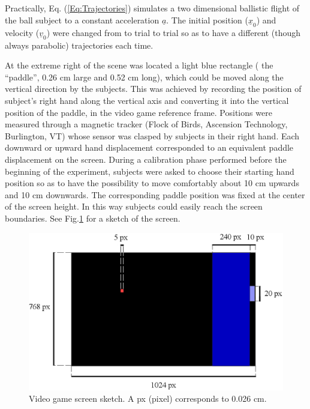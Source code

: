 Practically, Eq. (\ref{Eq:Trajectories}) simulates a two dimensional ballistic flight of the ball
subject to a constant acceleration $\underline{a}$. The initial position ($\underline{x}_0$) and velocity ($\underline{v}_0$) were changed from to trial to trial so as to have a different (though always parabolic) trajectories each time.

At the extreme right of the scene was located a light blue rectangle ( the ``paddle'', 0.26 cm large and 0.52 cm long), which could be moved along the vertical direction by the subjects. This was achieved by recording the position of subject's right hand along the vertical axis and converting it into the vertical position of the paddle, in the video game reference frame. 
Positions were measured through a magnetic tracker (Flock of Birds, Ascension Technology, Burlington, VT) whose sensor was clasped by subjects in their right hand. Each downward or upward hand displacement corresponded to an equivalent paddle displacement on the screen. During a calibration phase performed before the beginning of the experiment, subjects were asked to choose their starting hand position so as to have the possibility to move comfortably about 10 cm upwards and 10 cm downwards. The corresponding paddle position was fixed at the center of the screen height. In this way subjects could easily reach the screen boundaries.
See Fig.\ref{figSchemaPong} for a sketch of the screen.

\begin{figure}[ht]
	\centering
		\includegraphics[width=15cm]{fig/schema_pong.eps}
	\caption{Video game screen sketch. A px (pixel) corresponds to 0.026 cm.}
	\label{figSchemaPong}
\end{figure}



